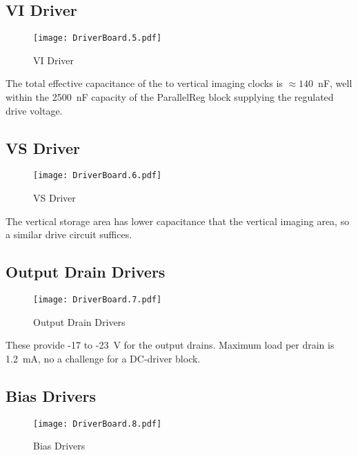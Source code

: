 \documentclass[a4paper,12pt]{article}
\begin{document}
\subsection{VI Driver}
   \begin{figure}
   \begin{center}
   \texttt{[image: DriverBoard.5.pdf]}
   \end{center}
   \caption{VI Driver}
   \end{figure}

The total effective capacitance of the to vertical imaging clocks is $\approx 140$\ nF, well within the 2500\ nF capacity of the ParallelReg block supplying the regulated drive voltage.

\subsection{VS Driver}
   \begin{figure}
   \begin{center}
   \texttt{[image: DriverBoard.6.pdf]}
   \end{center}
   \caption{VS Driver}
   \end{figure}

The vertical storage area has lower capacitance that the vertical imaging area, so a similar drive circuit suffices.

\subsection{Output Drain Drivers}
   \begin{figure}
   \begin{center}
   \texttt{[image: DriverBoard.7.pdf]}
   \end{center}
   \caption{Output Drain Drivers}
   \end{figure}

These provide -17 to -23\ V for the output drains. Maximum load per drain is 1.2\ mA, no a challenge for a DC-driver block.  

\subsection{Bias Drivers}
   \begin{figure}
   \begin{center}
   \texttt{[image: DriverBoard.8.pdf]}
   \end{center}
   \caption{Bias Drivers}
   \end{figure}
  
\end{document}
